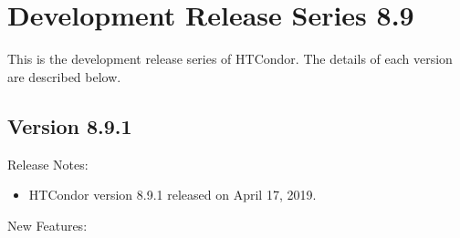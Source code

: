 
\section{Development Release Series 8.9}\label{sec:History-8-9}

This is the development release series of HTCondor.
The details of each version are described below.

\subsection*{\label{sec:New-8-9-1}Version 8.9.1}

\noindent Release Notes:

\begin{itemize}

\item HTCondor version 8.9.1 released on April 17, 2019.

\end{itemize}


\noindent New Features:

